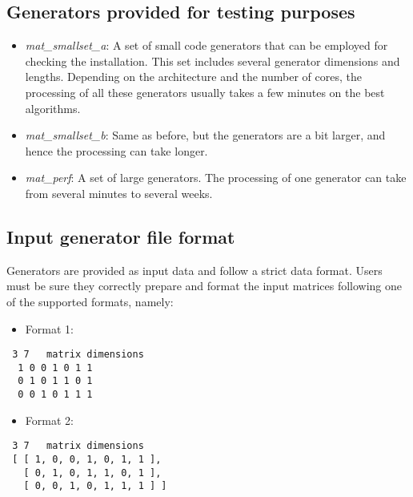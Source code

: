 \documentclass[]{article}
\providecommand{\tightlist}{%
  \setlength{\itemsep}{0pt}\setlength{\parskip}{0pt}}
\begin{document}
\hypertarget{generators-provided-for-testing-purposes}{%
\subsection{Generators provided for testing
purposes}\label{generators-provided-for-testing-purposes}}

\begin{itemize}
\item
  \emph{mat\_smallset\_a}: A set of small code generators that can be
  employed for checking the installation. This set includes several
  generator dimensions and lengths. Depending on the architecture and
  the number of cores, the processing of all these generators usually
  takes a few minutes on the best algorithms.
\item
  \emph{mat\_smallset\_b}: Same as before, but the generators are a bit
  larger, and hence the processing can take longer.
\item
  \emph{mat\_perf}: A set of large generators. The processing of one
  generator can take from several minutes to several weeks.
\end{itemize}

\hypertarget{input-generator-file-format}{%
\subsection{Input generator file
format}\label{input-generator-file-format}}

Generators are provided as input data and follow a strict data format.
Users must be sure they correctly prepare and format the input matrices
following one of the supported formats, namely:

\begin{itemize}
\tightlist
\item
  Format 1:
\end{itemize}

\begin{verbatim}
 3 7   matrix dimensions
  1 0 0 1 0 1 1
  0 1 0 1 1 0 1
  0 0 1 0 1 1 1
\end{verbatim}

\begin{itemize}
\tightlist
\item
  Format 2:
\end{itemize}

\begin{verbatim}
 3 7   matrix dimensions
 [ [ 1, 0, 0, 1, 0, 1, 1 ],
   [ 0, 1, 0, 1, 1, 0, 1 ],
   [ 0, 0, 1, 0, 1, 1, 1 ] ]
\end{verbatim}
\end{document}
